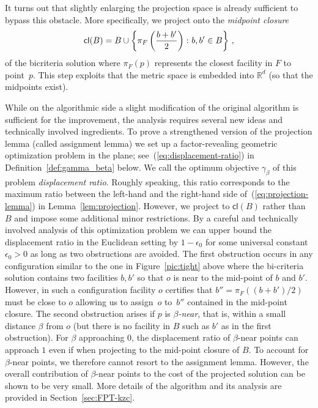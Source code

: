 \documentclass[11pt]{article}
\newcommand{\bRd}{\ensuremath{\mathbb{R}^d}\xspace}
\begin{document}
It turns out that slightly enlarging the projection space is already sufficient to bypass this obstacle. More specifically, we project onto the \emph{midpoint closure}
\begin{equation}\label{eq:midpt-closure}
  {\sf cl}(B) = B \cup \left\{\pi_F\left(\frac{b+b'}{2}\right)\colon b, b' \in B\right\}\, ,
\end{equation}
 of the bicriteria solution where $\pi_F(p)$ represents the closest facility in $F$ to point~$p$. This step exploits that the metric space is embedded into $\bRd$ (so that the midpoints exist).


While on the algorithmic side a slight modification of the original algorithm is sufficient for the improvement, the analysis requires several new ideas and technically involved ingredients. To prove a strengthened version of the projection lemma (called  assignment lemma) we set up a factor-revealing geometric optimization problem in the plane; see~(\ref{eq:displacement-ratio}) in Definition~\ref{def:gamma_beta} below. We call the optimum objective $\gamma_\beta$ of this problem \emph{displacement ratio}. Roughly speaking, this ratio corresponds to the maximum ratio between the left-hand and the right-hand side of~(\ref{eq:projection-lemma}) in Lemma~\ref{lem:projection}. However, we project to $\textsf{cl}(B)$ rather than $B$ and impose some additional minor restrictions. By a careful and technically involved analysis of this optimization problem we can upper bound the displacement ratio in the Euclidean setting by $1-\epsilon_0$ for some universal constant $\epsilon_0>0$ as long as two obstructions are avoided. The first obstruction occurs in any configuration similar to the one in Figure~\ref{pic:tight} above where the bi-criteria solution contains two facilities $b,b'$ so that $o$ is near to the mid-point of $b$ and $b'$. However, in such a configuration facility $o$ certifies that $b''=\pi_F((b+b')/2)$ must be close to $o$ allowing us to assign~$o$ to~$b''$ contained in the mid-point closure. The second obstruction arises if $p$ is \emph{$\beta$-near}, that is, within a small distance $\beta$ from $o$ (but there is no facility in $B$ such as $b'$ as in the first obstruction). For $\beta$ approaching $0$, the displacement ratio of $\beta$-near points can approach $1$ even if when projecting to the mid-point closure of $B$. To account for $\beta$-near points, we therefore cannot resort to the assignment lemma. However, the overall contribution of $\beta$-near  points to the cost of the projected solution can be shown to be very small. More details of the algorithm and its analysis are provided in Section~\ref{sec:FPT-kzc}. 
\end{document}
